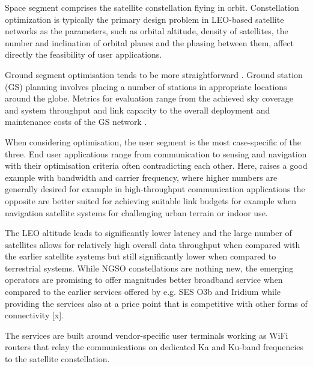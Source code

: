 \documentclass[english, 12pt, a4paper, elec, utf8, a-1b, online]{aaltothesis}
\begin{document}
Space segment comprises the satellite constellation flying in orbit.
Constellation optimization is typically the primary design problem in LEO-based satellite networks as the parameters, such as orbital altitude, density of satellites, the number and inclination of orbital planes and the phasing between them, affect directly the feasibility of user applications.%

Ground segment optimisation tends to be more straightforward .
Ground station (GS) planning involves placing a number of stations in appropriate locations around the globe.
Metrics for evaluation range from the achieved sky coverage and system throughput and link capacity to the overall deployment and maintenance costs of the GS network \cite{celikbilek2022survey}.

When considering optimisation, the user segment is the most case-specific of the three.
End user applications range from communication to sensing and navigation with their optimisation criteria often contradicting each other.
Here, \cite{celikbilek2022survey} raises a good example with bandwidth and carrier frequency, where higher numbers are generally desired for example in high-throughput communication applications the opposite are better suited for achieving suitable link budgets for example when navigation satellite systems for challenging urban terrain or indoor use.

The LEO altitude leads to significantly lower latency and the large number of satellites allows for relatively high overall data throughput when compared with the earlier satellite systems but still significantly lower when compared to terrestrial systems.
While NGSO constellations are nothing new, the emerging operators are promising to offer magnitudes better broadband service when compared to the earlier services offered by e.g.
SES O3b and Iridium while providing the services also at a price point that is competitive with other forms of connectivity [x].

The services are built around vendor-specific user terminals working as WiFi routers that relay the communications on dedicated Ka and Ku-band frequencies to the satellite constellation.
\end{document}
